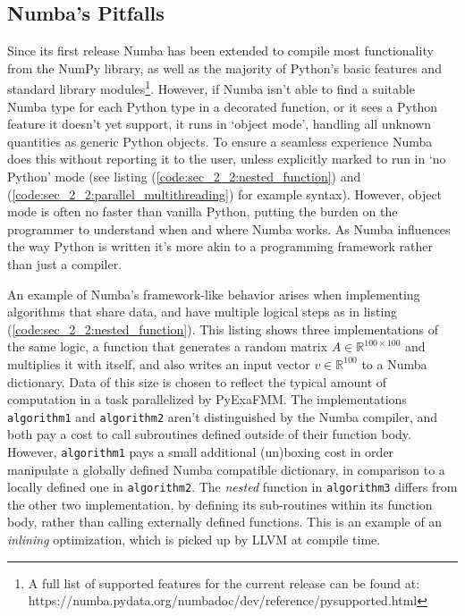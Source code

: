 \subsection*{Numba's Pitfalls}


Since its first release Numba has been extended to compile most functionality from the NumPy library, as well as the majority of Python's basic features and standard library modules\footnote{A full list of supported features for the current release can be found at: https://numba.pydata.org/numba\-doc/dev/reference/pysupported.html}. However, if Numba isn't able to find a suitable Numba type for each Python type in a decorated function, or it sees a Python feature it doesn't yet support, it runs in `object mode', handling all unknown quantities as generic Python objects. To ensure a seamless experience Numba does this without reporting it to the user, unless explicitly marked to run in `no Python' mode (see listing (\ref{code:sec_2_2:nested_function}) and (\ref{code:sec_2_2:parallel_multithreading}) for example syntax). However, object mode is often no faster than vanilla Python, putting the burden on the programmer to understand when and where Numba works. As Numba influences the way Python is written it's more akin to a programming framework rather than just a compiler.

An example of Numba's framework-like behavior arises when implementing algorithms that share data, and have multiple logical steps as in listing (\ref{code:sec_2_2:nested_function}). This listing shows three implementations of the same logic, a function that generates a random matrix $A \in \mathbb{R}^{100 \times 100}$ and multiplies it with itself, and also writes an input vector $v \in \mathbb{R}^{100}$ to a Numba dictionary. Data of this size is chosen to reflect the typical amount of computation in a task parallelized by PyExaFMM. The implementations \lstinline{algorithm1} and \lstinline{algorithm2} aren't distinguished by the Numba compiler, and both pay a cost to call subroutines defined outside of their function body. However, \lstinline{algorithm1} pays a small additional (un)boxing cost in order manipulate a globally defined Numba compatible dictionary, in comparison to a locally defined one in \lstinline{algorithm2}. The \textit{nested} function in \lstinline{algorithm3} differs from the other two implementation, by defining its sub-routines within its function body, rather than calling externally defined functions. This is an example of an \textit{inlining} optimization, which is picked up by LLVM at compile time.

